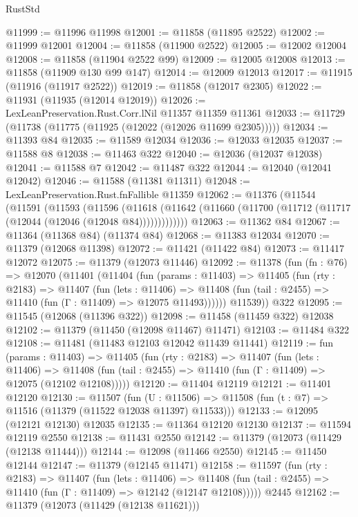 \begin{lexlean}{RustStd}
\begin{coremodule}
@11999 := @11996 @11998
@12001 := @11858 (@11895 @2522)
@12002 := @11999 @12001
@12004 := @11858 (@11900 @2522)
@12005 := @12002 @12004
@12008 := @11858 (@11904 @2522 @99)
@12009 := @12005 @12008
@12013 := @11858 (@11909 @130 @99 @147)
@12014 := @12009 @12013
@12017 := @11915 (@11916 (@11917 @2522))
@12019 := @11858 (@12017 @2305)
@12022 := @11931 (@11935 (@12014 @12019))
@12026 := LexLeanPreservation.Rust.Corr.lNil @11357 @11359 @11361
@12033 := @11729 (@11738 (@11775 (@11925 (@12022 (@12026 @11699 @2305)))))
@12034 := @11393 @84
@12035 := @11589 @12034
@12036 := @12033 @12035
@12037 := @11588 @8
@12038 := @11463 @322
@12040 := @12036 (@12037 @12038)
@12041 := @11588 @7
@12042 := @11487 @322
@12044 := @12040 (@12041 @12042)
@12046 := @11588 (@11381 @11311)
@12048 := LexLeanPreservation.Rust.fnFallible @11359
@12062 := @11376
    (@11544
      (@11591
        (@11593
          (@11596
            (@11618 (@11642 (@11660 (@11700 (@11712 (@11717 (@12044 (@12046 (@12048 @84)))))))))))))
@12063 := @11362 @84
@12067 := @11364 (@11368 @84) (@11374 @84)
@12068 := @11383 @12034
@12070 := @11379 (@12068 @11398)
@12072 := @11421 (@11422 @84)
@12073 := @11417 @12072
@12075 := @11379 (@12073 @11446)
@12092 := @11378
    (fun (fn : @76) =>
    @12070
      (@11401
        (@11404
          (fun (params : @11403) =>
          @11405
            (fun (rty : @2183) =>
            @11407
              (fun (lets : @11406) =>
              @11408 (fun (tail : @2455) => @11410 (fun (Γ : @11409) => @12075 @11493))))))
        @11539))
    @322
@12095 := @11545 (@12068 (@11396 @322))
@12098 := @11458 (@11459 @322) @12038
@12102 := @11379 (@11450 (@12098 @11467) @11471)
@12103 := @11484 @322
@12108 := @11481 (@11483 @12103 @12042 @11439 @11441)
@12119 := fun (params : @11403) =>
  @11405
    (fun (rty : @2183) =>
    @11407
      (fun (lets : @11406) =>
      @11408 (fun (tail : @2455) => @11410 (fun (Γ : @11409) => @12075 (@12102 @12108)))))
@12120 := @11404 @12119
@12121 := @11401 @12120
@12130 := @11507
    (fun (U : @11506) => @11508 (fun (t : @7) => @11516 (@11379 (@11522 @12038 @11397) @11533)))
@12133 := @12095 (@12121 @12130) @12035
@12135 := @11364 @12120 @12130
@12137 := @11594 @12119 @2550
@12138 := @11431 @2550
@12142 := @11379 (@12073 (@11429 (@12138 @11444)))
@12144 := @12098 (@11466 @2550)
@12145 := @11450 @12144
@12147 := @11379 (@12145 @11471)
@12158 := @11597
    (fun (rty : @2183) =>
    @11407
      (fun (lets : @11406) =>
      @11408 (fun (tail : @2455) => @11410 (fun (Γ : @11409) => @12142 (@12147 @12108)))))
    @2445
@12162 := @11379 (@12073 (@11429 (@12138 @11621)))

\end{coremodule}
\end{lexlean}
